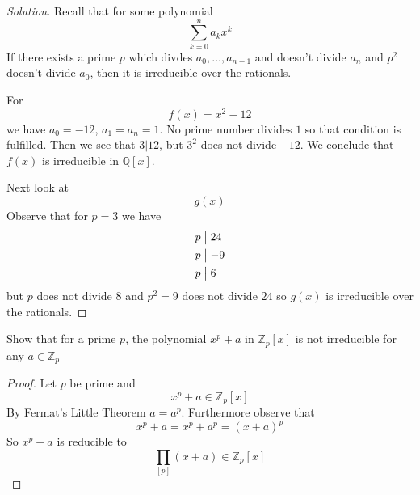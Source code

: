 \begin{proof}[Solution]
    Recall that for some polynomial 
    \[
        \displaystyle\sum_{k=0}^{n}a_kx^k
    \]
    If there exists a prime $p$ which divdes $a_0,\ldots,a_{n-1}$
    and doesn't divide $a_n$ and $p^2$ doesn't divide $a_0$, 
    then it is irreducible over the rationals. 

    For 
    \[
        f(x) = x^2 - 12
    \]
    we have $a_0 = -12$, $a_1 = a_n = 1$. 
    No prime number divides $1$ so that condition is fulfilled. 
    Then we see that $3 | 12$, but $3^2$ does not divide $-12$.
    We conclude that $f(x)$ is irreducible in $\mathbb Q[x]$.

    Next look at 
    \[
        g(x)
    \]
    Observe that for $p = 3$ we have 
    \begin{align*}
        p &\bigm| 24 \\ 
        p &\bigm| -9 \\ 
        p &\bigm| 6 \\ 
    \end{align*}
    but $p$ does not divide $8$ and $p^2 = 9$ does not divide 
    $24$ so $g(x)$ is irreducible over the rationals.
\end{proof}
\begin{prob}
    Show that for a prime $p$, the polynomial 
    $x^p + a$ in $\mathbb Z_p[x]$ is not irreducible for any 
    $a \in \mathbb Z_p$
\end{prob}
\begin{proof}
    Let $p$ be prime and 
    \[
        x^p + a \in \mathbb Z_p[x]
    \]
    By Fermat's Little Theorem $a = a^p$. 
    Furthermore observe that 
    \[
        x^p + a = x^p + a^p = (x+a)^p
    \]
    So $x^p + a$ is reducible to 
    \[
        \prod_{[p]}(x+a) \in \mathbb Z_p[x]
    \]
 \end{proof}

